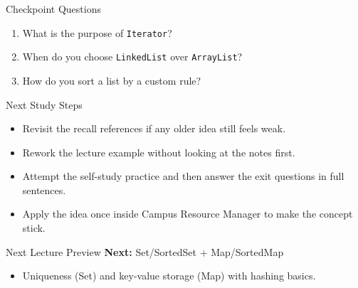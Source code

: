 \documentclass{beamer}
\begin{document}
\begin{frame}{Checkpoint Questions}
  \begin{enumerate}[<+->]
    \item What is the purpose of \texttt{Iterator}?
    \item When do you choose \texttt{LinkedList} over \texttt{ArrayList}?
    \item How do you sort a list by a custom rule?
  \end{enumerate}
  \slidesources{\OOPSUnitVSources}
\end{frame}

\begin{frame}{Next Study Steps}
\begin{itemize}[<+->]
  \item Revisit the recall references if any older idea still feels weak.
  \item Rework the lecture example without looking at the notes first.
  \item Attempt the self-study practice and then answer the exit questions in full sentences.
  \item Apply the idea once inside Campus Resource Manager to make the concept stick.
\end{itemize}
  \slidesources{\OOPSUnitVSources}
\end{frame}

\begin{frame}{Next Lecture Preview}
  \textbf{Next:} Set/SortedSet + Map/SortedMap
  \vspace{0.6em}
  \begin{itemize}[<+->]
    \item Uniqueness (Set) and key-value storage (Map) with hashing basics.
  \end{itemize}
  \slidesources{\OOPSUnitVSources}
\end{frame}
\end{document}

